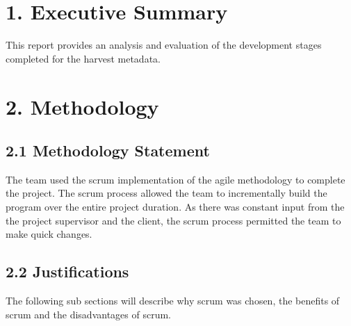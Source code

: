\documentclass[11pt]{article}
\begin{document}
\newpage





\tableofcontents
\newpage






\setcounter{secnumdepth}{0}

\section{1. Executive Summary}
This report provides an analysis and evaluation of the development stages completed for the harvest metadata.

\newpage




\section{2. Methodology}

\subsection{2.1 Methodology Statement}
The team used the scrum implementation of the agile methodology to complete the project. The scrum process allowed the team to incrementally build the program over the entire project duration. As there was constant input from the the project supervisor and the client, the scrum process permitted the team to make quick changes.

\subsection{2.2 Justifications}
The following sub sections will describe why scrum was chosen, the benefits of scrum and the disadvantages of scrum.
\end{document}
